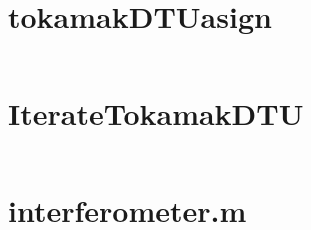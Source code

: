 \appendix
\appendixpage
\addappheadtotoc
\section{tokamakDTU\textunderscore asign}\label{tokamakDTU_asign_1}
\inputminted[bgcolor=Black,linenos=true]{matlab}{Listings/tokamakDTU_asign_1.m}\newpage
\section{IterateTokamakDTU}\label{IterateTokamakDTU}
\inputminted[bgcolor=Black,linenos=true]{matlab}{Listings/IterateTokamakDTU.m}\newpage
\section{interferometer.m}\label{inter}
\inputminted[bgcolor=Black,linenos=true]{matlab}{Listings/interferometer.m}
